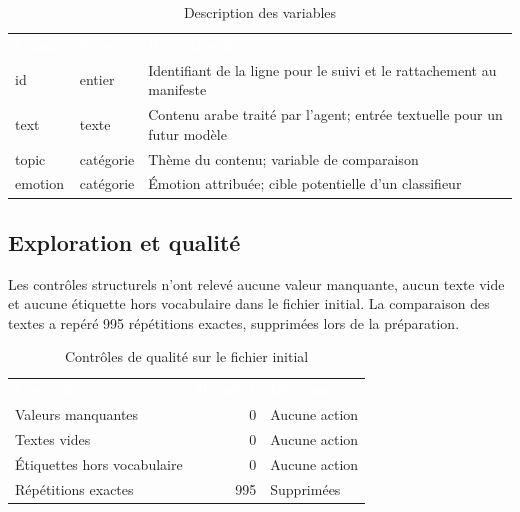 \documentclass[11pt,a4paper]{article}
\newcommand{\headtab}[1]{\textcolor{white}{\sffamily\bfseries #1}}
\begin{document}
\begin{table}[H]
\centering
\caption{Description des variables}
\begin{tabularx}{\linewidth}{>{\ttfamily}l l X}
\rowcolor{navy}\headtab{Champ} & \headtab{Type} & \headtab{Rôle dans le projet} \\
id & entier & Identifiant de la ligne pour le suivi et le rattachement au manifeste \\
text & texte & Contenu arabe traité par l'agent; entrée textuelle pour un futur modèle \\
topic & catégorie & Thème du contenu; variable de comparaison \\
emotion & catégorie & Émotion attribuée; cible potentielle d'un classifieur \\
\bottomrule
\end{tabularx}
\end{table}

\subsection{Exploration et qualité}
Les contrôles structurels n'ont relevé aucune valeur manquante, aucun texte vide et aucune étiquette hors vocabulaire dans le fichier initial. La comparaison des textes a repéré 995 répétitions exactes, supprimées lors de la préparation.

\begin{table}[H]
\centering
\caption{Contrôles de qualité sur le fichier initial}
\begin{tabular}{lrl}
\rowcolor{navy}\headtab{Contrôle} & \headtab{Résultat} & \headtab{Décision} \\
Valeurs manquantes & 0 & Aucune action \\
Textes vides & 0 & Aucune action \\
Étiquettes hors vocabulaire & 0 & Aucune action \\
Répétitions exactes & 995 & Supprimées \\
\bottomrule
\end{tabular}
\end{table}
\end{document}
